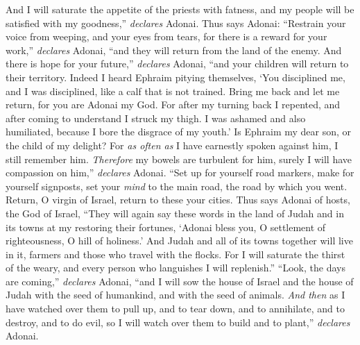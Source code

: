 \begin{biblechapter}
\verse And I will saturate the appetite of the priests with fatness, 
and my people will be satisfied with my goodness,” \textit{declares} Adonai.
\verse Thus says Adonai:
\verse “Restrain your voice from weeping, 
and your eyes from tears, 
for there is a reward for your work,” \textit{declares} Adonai, 
“and they will return from the land of the enemy.
\verse And there is hope for your future,” \textit{declares} Adonai, 
“and your children will return to their territory.
\verse Indeed I heard Ephraim pitying themselves, 
‘You disciplined me, and I was disciplined, 
like a calf that is not trained. 
Bring me back and let me return, 
for you are Adonai my God.
\verse For after my turning back I repented, 
and after coming to understand I struck my thigh. 
I was ashamed and also humiliated, 
because I bore the disgrace of my youth.’
\verse Is Ephraim my dear son, 
or the child of my delight? 
For \textit{as often as} I have earnestly spoken against him, 
I still remember him. 
\textit{Therefore} my bowels are turbulent for him, 
surely I will have compassion on him,” \textit{declares} Adonai.
\verse “Set up for yourself road markers, 
make for yourself signposts, 
set your \textit{mind} to the main road, 
the road by which you went. 
Return, O virgin of Israel, 
return to these your cities.
\verse Thus says Adonai of hosts, the God of Israel, “They will again say these words in the land of Judah and in its towns at my restoring their fortunes,
\verse ‘Adonai bless you, O settlement of righteousness, 
O hill of holiness.’
\verse And Judah and all of its towns together will live in it, 
farmers and those who travel with the flocks.
\verse For I will saturate the thirst of the weary, 
and every person who languishes I will replenish.”
 “Look, the days are coming,” \textit{declares} Adonai, “and I will sow the house of Israel and the house of Judah with the seed of humankind, and with the seed of animals.
\verse \textit{And then} as I have watched over them to pull up, and to tear down, and to annihilate, and to destroy, and to do evil, so I will watch over them to build and to plant,” \textit{declares} Adonai.

\end{biblechapter}
